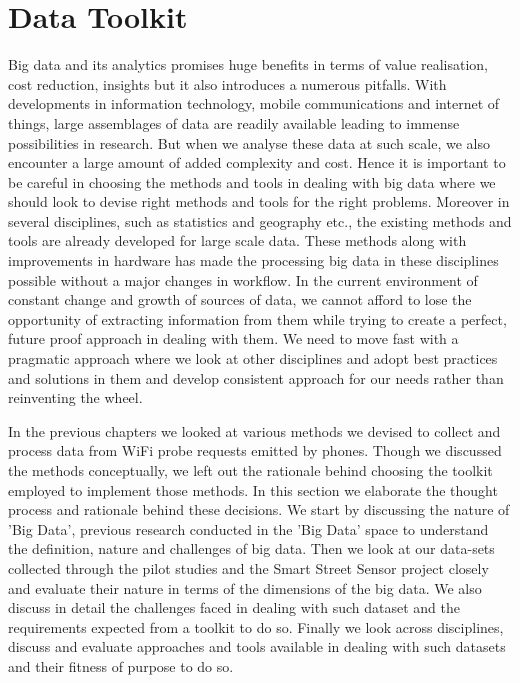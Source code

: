 \section{Data Toolkit}

Big data and its analytics promises huge benefits in terms of value realisation, cost reduction, insights but it also introduces a numerous pitfalls.
With developments in information technology, mobile communications and internet of things, large assemblages of data are readily available leading to immense possibilities in research.
But when we analyse these data at such scale, we also encounter a large amount of added complexity and cost.
Hence it is important to be careful in choosing the methods and tools in dealing with big data where we should look to devise right methods and tools for the right problems.
Moreover in several disciplines, such as statistics and geography etc., the existing methods and tools are already developed for large scale data.
These methods along with improvements in hardware has made the processing big data in these disciplines possible without a major changes in workflow.
In the current environment of constant change and growth of sources of data, we cannot afford to lose the opportunity of extracting information from them while trying to create a perfect, future proof approach in dealing with them.
We need to move fast with a pragmatic approach where we look at other disciplines and adopt best practices and solutions in them and develop consistent approach for our needs rather than reinventing the wheel.

In the previous chapters we looked at various methods we devised to collect and process data from WiFi probe requests emitted by phones.
Though we discussed the methods conceptually, we left out the rationale behind choosing the toolkit employed to implement those methods.
In this section we elaborate the thought process and rationale behind these decisions.
We start by discussing the nature of 'Big Data', previous research conducted in the 'Big Data' space to understand the definition, nature and challenges of big data.
Then we look at our data-sets collected through the pilot studies and the Smart Street Sensor project closely and evaluate their nature in terms of the dimensions of the big data.
We also discuss in detail the challenges faced in dealing with such dataset and the requirements expected from a toolkit to do so.
Finally we look across disciplines, discuss and evaluate approaches and tools available in dealing with such datasets and their fitness of purpose to do so.

